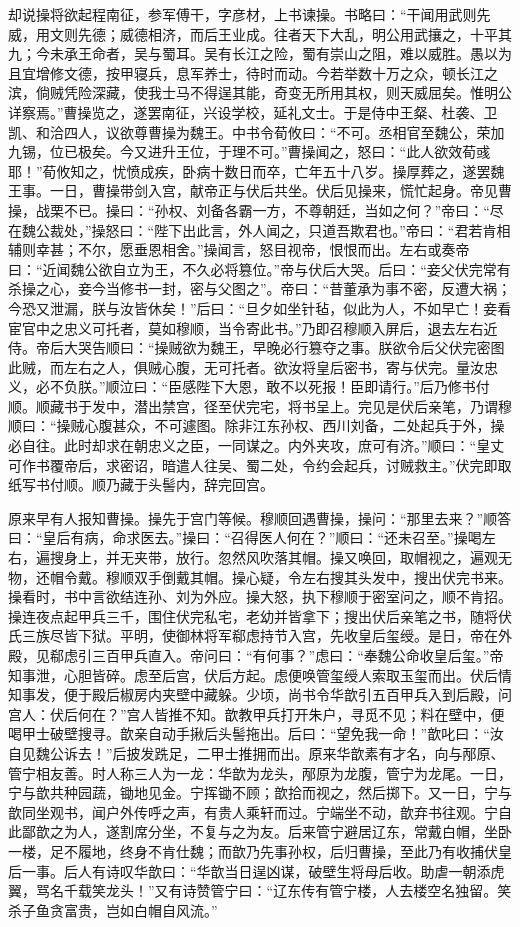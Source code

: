 却说操将欲起程南征，参军傅干，字彦材，上书谏操。书略曰：“干闻用武则先威，用文则先德；威德相济，而后王业成。往者天下大乱，明公用武攘之，十平其九；今未承王命者，吴与蜀耳。吴有长江之险，蜀有崇山之阻，难以威胜。愚以为且宜增修文德，按甲寝兵，息军养士，待时而动。今若举数十万之众，顿长江之滨，倘贼凭险深藏，使我士马不得逞其能，奇变无所用其权，则天威屈矣。惟明公详察焉。”曹操览之，遂罢南征，兴设学校，延礼文士。于是侍中王粲、杜袭、卫凯、和洽四人，议欲尊曹操为魏王。中书令荀攸曰：“不可。丞相官至魏公，荣加九锡，位已极矣。今又进升王位，于理不可。”曹操闻之，怒曰：“此人欲效荀彧耶！”荀攸知之，忧愤成疾，卧病十数日而卒，亡年五十八岁。操厚葬之，遂罢魏王事。一日，曹操带剑入宫，献帝正与伏后共坐。伏后见操来，慌忙起身。帝见曹操，战栗不已。操曰：“孙权、刘备各霸一方，不尊朝廷，当如之何？”帝曰：“尽在魏公裁处，”操怒曰：“陛下出此言，外人闻之，只道吾欺君也。”帝曰：“君若肯相辅则幸甚；不尔，愿垂恩相舍。”操闻言，怒目视帝，恨恨而出。左右或奏帝曰：“近闻魏公欲自立为王，不久必将篡位。”帝与伏后大哭。后曰：“妾父伏完常有杀操之心，妾今当修书一封，密与父图之”。帝曰：“昔董承为事不密，反遭大祸；今恐又泄漏，朕与汝皆休矣！”后曰：“旦夕如坐针毡，似此为人，不如早亡！妾看宦官中之忠义可托者，莫如穆顺，当令寄此书。”乃即召穆顺入屏后，退去左右近侍。帝后大哭告顺曰：“操贼欲为魏王，早晚必行篡夺之事。朕欲令后父伏完密图此贼，而左右之人，俱贼心腹，无可托者。欲汝将皇后密书，寄与伏完。量汝忠义，必不负朕。”顺泣曰：“臣感陛下大恩，敢不以死报！臣即请行。”后乃修书付顺。顺藏书于发中，潜出禁宫，径至伏完宅，将书呈上。完见是伏后亲笔，乃谓穆顺曰：“操贼心腹甚众，不可遽图。除非江东孙权、西川刘备，二处起兵于外，操必自往。此时却求在朝忠义之臣，一同谋之。内外夹攻，庶可有济。”顺曰：“皇丈可作书覆帝后，求密诏，暗遣人往吴、蜀二处，令约会起兵，讨贼救主。”伏完即取纸写书付顺。顺乃藏于头髻内，辞完回宫。

原来早有人报知曹操。操先于宫门等候。穆顺回遇曹操，操问：“那里去来？”顺答曰：“皇后有病，命求医去。”操曰：“召得医人何在？”顺曰：“还未召至。”操喝左右，遍搜身上，并无夹带，放行。忽然风吹落其帽。操又唤回，取帽视之，遍观无物，还帽令戴。穆顺双手倒戴其帽。操心疑，令左右搜其头发中，搜出伏完书来。操看时，书中言欲结连孙、刘为外应。操大怒，执下穆顺于密室问之，顺不肯招。操连夜点起甲兵三千，围住伏完私宅，老幼并皆拿下；搜出伏后亲笔之书，随将伏氏三族尽皆下狱。平明，使御林将军郗虑持节入宫，先收皇后玺绶。是日，帝在外殿，见郗虑引三百甲兵直入。帝问曰：“有何事？”虑曰：“奉魏公命收皇后玺。”帝知事泄，心胆皆碎。虑至后宫，伏后方起。虑便唤管玺绶人索取玉玺而出。伏后情知事发，便于殿后椒房内夹壁中藏躲。少顷，尚书令华歆引五百甲兵入到后殿，问宫人：伏后何在？”宫人皆推不知。歆教甲兵打开朱户，寻觅不见；料在壁中，便喝甲士破壁搜寻。歆亲自动手揪后头髻拖出。后曰：“望免我一命！”歆叱曰：“汝自见魏公诉去！”后披发跣足，二甲士推拥而出。原来华歆素有才名，向与邴原、管宁相友善。时人称三人为一龙：华歆为龙头，邴原为龙腹，管宁为龙尾。一日，宁与歆共种园蔬，锄地见金。宁挥锄不顾；歆拾而视之，然后掷下。又一日，宁与歆同坐观书，闻户外传呼之声，有贵人乘轩而过。宁端坐不动，歆弃书往观。宁自此鄙歆之为人，遂割席分坐，不复与之为友。后来管宁避居辽东，常戴白帽，坐卧一楼，足不履地，终身不肯仕魏；而歆乃先事孙权，后归曹操，至此乃有收捕伏皇后一事。后人有诗叹华歆曰：“华歆当日逞凶谋，破壁生将母后收。助虐一朝添虎翼，骂名千载笑龙头！”又有诗赞管宁曰：“辽东传有管宁楼，人去楼空名独留。笑杀子鱼贪富贵，岂如白帽自风流。”

